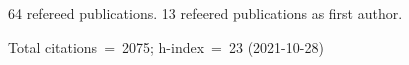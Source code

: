64 refereed publications. 13 refeered publications as first author.

Total citations~=~2075; h-index~=~23 (2021-10-28)